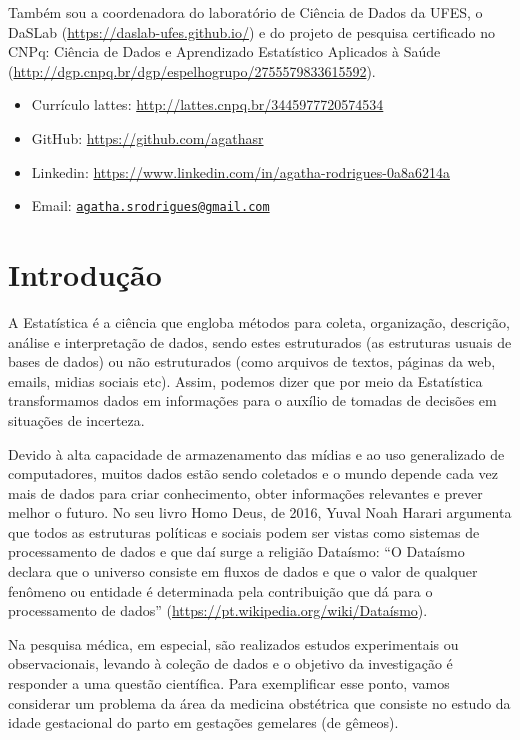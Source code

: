 \documentclass[
]{book}
\providecommand{\tightlist}{%
  \setlength{\itemsep}{0pt}\setlength{\parskip}{0pt}}
\begin{document}
Também sou a coordenadora do laboratório de Ciência de Dados da UFES, o DaSLab (\url{https://daslab-ufes.github.io/}) e do projeto de pesquisa certificado no CNPq: Ciência de Dados e Aprendizado Estatístico Aplicados à Saúde (\url{http://dgp.cnpq.br/dgp/espelhogrupo/2755579833615592}).

\begin{itemize}
\tightlist
\item
  Currículo lattes: \url{http://lattes.cnpq.br/3445977720574534}
\item
  GitHub: \url{https://github.com/agathasr}
\item
  Linkedin: \url{https://www.linkedin.com/in/agatha-rodrigues-0a8a6214a}
\item
  Email: \href{mailto:agatha.srodrigues@gmail.com}{\nolinkurl{agatha.srodrigues@gmail.com}}
\end{itemize}

\hypertarget{intro}{%
\chapter{Introdução}\label{intro}}

A Estatística é a ciência que engloba métodos para coleta, organização, descrição, análise e interpretação de dados, sendo estes estruturados (as estruturas usuais de bases de dados) ou não estruturados (como arquivos de textos, páginas da web, emails, midias sociais etc). Assim, podemos dizer que por meio da Estatística transformamos dados em informações para o auxílio de tomadas de decisões em situações de incerteza.

Devido à alta capacidade de armazenamento das mídias e ao uso generalizado de computadores, muitos dados estão sendo coletados e o mundo depende cada vez mais de dados para criar conhecimento, obter informações relevantes e prever melhor o futuro. No seu livro Homo Deus, de 2016, Yuval Noah Harari argumenta que todos as estruturas políticas e sociais podem ser vistas como sistemas de processamento de dados e que daí surge a religião Dataísmo: ``O Dataísmo declara que o universo consiste em fluxos de dados e que o valor de qualquer fenômeno ou entidade é determinada pela contribuição que dá para o processamento de dados'' (\url{https://pt.wikipedia.org/wiki/Dataísmo}).

Na pesquisa médica, em especial, são realizados estudos experimentais ou observacionais, levando à coleção de dados e o objetivo da investigação é responder a uma questão científica. Para exemplificar esse ponto, vamos considerar um problema da área da medicina obstétrica que consiste no estudo da idade gestacional do parto em gestações gemelares (de gêmeos).
\end{document}
